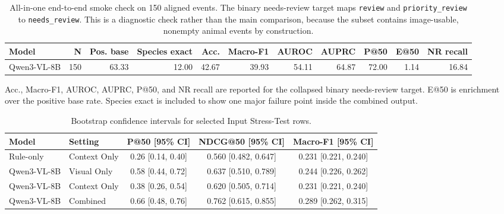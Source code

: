 \documentclass{article}
\begin{document}
\begin{table}[h]
\centering
\caption{All-in-one end-to-end smoke check on 150 aligned events. The binary needs-review target maps \texttt{review} and \texttt{priority\_review} to \texttt{needs\_review}. This is a diagnostic check rather than the main comparison, because the subset contains image-usable, nonempty animal events by construction.}
\label{tab:end2end_smoke}
\scriptsize
\setlength{\tabcolsep}{3.2pt}
\begin{tabular}{lrrrrrrrrrr}
\toprule
Model & N & Pos. base & Species exact & Acc. & Macro-F1 & AUROC & AUPRC & P@50 & E@50 & NR recall \\
\midrule
Qwen3-VL-8B & 150 & 63.33 & 12.00 & 42.67 & 39.93 & 54.11 & 64.87 & 72.00 & 1.14 & 16.84 \\
\bottomrule
\end{tabular}
\vspace{0.25em}
\begin{minipage}{0.97\linewidth}
\footnotesize
Acc., Macro-F1, AUROC, AUPRC, P@50, and NR recall are reported for the collapsed binary needs-review target. E@50 is enrichment over the positive base rate. Species exact is included to show one major failure point inside the combined output.
\end{minipage}
\end{table}

\begin{table}[h]
\centering
\caption{Bootstrap confidence intervals for selected Input Stress-Test rows.}
\label{tab:ci}
\small
\begin{tabular}{llccc}
\toprule
Model & Setting & P@50 [95\% CI] & NDCG@50 [95\% CI] & Macro-F1 [95\% CI] \\
\midrule
Rule-only & Context Only & 0.26 [0.14, 0.40] & 0.560 [0.482, 0.647] & 0.231 [0.221, 0.240] \\
Qwen3-VL-8B & Visual Only & 0.58 [0.44, 0.72] & 0.637 [0.510, 0.789] & 0.244 [0.226, 0.262] \\
Qwen3-VL-8B & Context Only & 0.38 [0.26, 0.54] & 0.620 [0.505, 0.714] & 0.231 [0.221, 0.240] \\
Qwen3-VL-8B & Combined & 0.66 [0.48, 0.76] & 0.762 [0.615, 0.855] & 0.289 [0.262, 0.315] \\
\bottomrule
\end{tabular}
\end{table}




\end{document}
